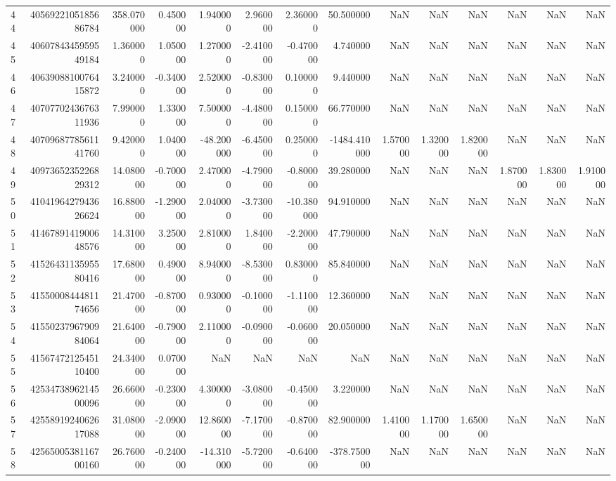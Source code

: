 \begin{tabular}{lrrrrrrrrrrrrr}
44 & 4056922105185686784 & 358.070000 & 0.450000 & 1.940000 & 2.960000 & 2.360000 & 50.500000 & NaN & NaN & NaN & NaN & NaN & NaN \\
45 & 4060784345959549184 & 1.360000 & 1.050000 & 1.270000 & -2.410000 & -0.470000 & 4.740000 & NaN & NaN & NaN & NaN & NaN & NaN \\
46 & 4063908810076415872 & 3.240000 & -0.340000 & 2.520000 & -0.830000 & 0.100000 & 9.440000 & NaN & NaN & NaN & NaN & NaN & NaN \\
47 & 4070770243676311936 & 7.990000 & 1.330000 & 7.500000 & -4.480000 & 0.150000 & 66.770000 & NaN & NaN & NaN & NaN & NaN & NaN \\
48 & 4070968778561141760 & 9.420000 & 1.040000 & -48.200000 & -6.450000 & 0.250000 & -1484.410000 & 1.570000 & 1.320000 & 1.820000 & NaN & NaN & NaN \\
49 & 4097365235226829312 & 14.080000 & -0.700000 & 2.470000 & -4.790000 & -0.800000 & 39.280000 & NaN & NaN & NaN & 1.870000 & 1.830000 & 1.910000 \\
50 & 4104196427943626624 & 16.880000 & -1.290000 & 2.040000 & -3.730000 & -10.380000 & 94.910000 & NaN & NaN & NaN & NaN & NaN & NaN \\
51 & 4146789141900648576 & 14.310000 & 3.250000 & 2.810000 & 1.840000 & -2.200000 & 47.790000 & NaN & NaN & NaN & NaN & NaN & NaN \\
52 & 4152643113595580416 & 17.680000 & 0.490000 & 8.940000 & -8.530000 & 0.830000 & 85.840000 & NaN & NaN & NaN & NaN & NaN & NaN \\
53 & 4155000844481174656 & 21.470000 & -0.870000 & 0.930000 & -0.100000 & -1.110000 & 12.360000 & NaN & NaN & NaN & NaN & NaN & NaN \\
54 & 4155023796790984064 & 21.640000 & -0.790000 & 2.110000 & -0.090000 & -0.060000 & 20.050000 & NaN & NaN & NaN & NaN & NaN & NaN \\
55 & 4156747212545110400 & 24.340000 & 0.070000 & NaN & NaN & NaN & NaN & NaN & NaN & NaN & NaN & NaN & NaN \\
56 & 4253473896214500096 & 26.660000 & -0.230000 & 4.300000 & -3.080000 & -0.450000 & 3.220000 & NaN & NaN & NaN & NaN & NaN & NaN \\
57 & 4255891924062617088 & 31.080000 & -2.090000 & 12.860000 & -7.170000 & -0.870000 & 82.900000 & 1.410000 & 1.170000 & 1.650000 & NaN & NaN & NaN \\
58 & 4256500538116700160 & 26.760000 & -0.240000 & -14.310000 & -5.720000 & -0.640000 & -378.750000 & NaN & NaN & NaN & NaN & NaN & NaN \\

\end{tabular}
